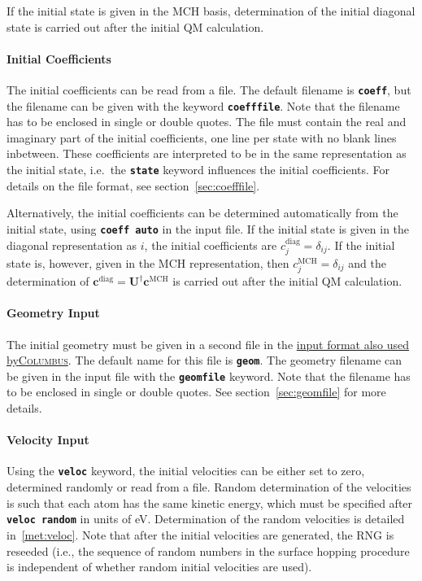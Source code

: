 \documentclass[a4paper,11pt,DIV=15,openany,twoside=false]{scrbook}
\newcommand{\ttt}[1]{\textbf{\texttt{#1}}}
\newcommand{\VEC}[1]{\ensuremath{\mathbf{#1}}}
\begin{document}
If the initial state is given in the MCH basis, determination of the initial diagonal state is carried out after the initial QM calculation.

\paragraph{Initial Coefficients}

The initial coefficients can be read from a file. The default filename is \ttt{coeff}, but the filename can be given with the keyword \ttt{coefffile}. Note that the filename has to be enclosed in single or double quotes. The file must contain the real and imaginary part of the initial coefficients, one line per state with no blank lines inbetween. These coefficients are interpreted to be in the same representation as the initial state, i.e.\ the \ttt{state} keyword influences the initial coefficients. For details on the file format, see section~\ref{sec:coefffile}.

Alternatively, the initial coefficients can be determined automatically from the initial state, using \ttt{coeff auto} in the input file. If the initial state is given in the diagonal representation as $i$, the initial coefficients are $c^{\text{diag}}_j=\delta_{ij}$. If the initial state is, however, given in the MCH representation, then $c^{\text{MCH}}_j=\delta_{ij}$ and the determination of $\VEC{c}^{\text{diag}}=\VEC{U}^\dagger\VEC{c}^{\text{MCH}}$ is carried out after the initial QM calculation. 

\paragraph{Geometry Input}

The initial geometry must be given in a second file in the  \href{http://www.univie.ac.at/columbus/docs_COL70/documentation_main.html}{input format also used by\textsc{Columbus}}. The default name for this file is \ttt{geom}. The geometry filename can be given in the input file with the \ttt{geomfile} keyword. Note that the filename has to be enclosed in single or double quotes. See section~\ref{sec:geomfile} for more details.

\paragraph{Velocity Input}

Using the \ttt{veloc} keyword, the initial velocities can be either set to zero, determined randomly or read from a file. Random determination of the velocities is such that each atom has the same kinetic energy, which must be specified after \ttt{veloc random} in units of eV. Determination of the random velocities is detailed in~\ref{met:veloc}. Note that after the initial velocities are generated, the RNG is reseeded (i.e., the sequence of random numbers in the surface hopping procedure is independent of whether random initial velocities are used).
\end{document}
